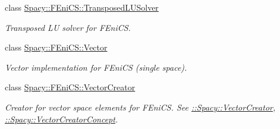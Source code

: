 \begin{DoxyCompactItemize}
class \hyperlink{classSpacy_1_1FEniCS_1_1TransposedLUSolver}{Spacy\+::\+F\+Eni\+C\+S\+::\+Transposed\+L\+U\+Solver}
\begin{DoxyCompactList}\small\item\em Transposed L\+U solver for F\+Eni\+C\+S. \end{DoxyCompactList}\item 
class \hyperlink{classSpacy_1_1FEniCS_1_1Vector}{Spacy\+::\+F\+Eni\+C\+S\+::\+Vector}
\begin{DoxyCompactList}\small\item\em Vector implementation for F\+Eni\+C\+S (single space). \end{DoxyCompactList}\item 
class \hyperlink{classSpacy_1_1FEniCS_1_1VectorCreator}{Spacy\+::\+F\+Eni\+C\+S\+::\+Vector\+Creator}
\begin{DoxyCompactList}\small\item\em Creator for vector space elements for F\+Eni\+C\+S. See \hyperlink{group__SpacyGroup_ga1f5316487c031a478247206764bb2efb_VectorCreatorAnchor}{\+:\+:Spacy\+:\+:Vector\+Creator}, \hyperlink{group__ConceptGroup_ga3064301642b7c66b1b08f88a12a04645_VectorCreatorConceptAnchor}{\+:\+:Spacy\+:\+:Vector\+Creator\+Concept}. \end{DoxyCompactList}\end{DoxyCompactItemize}
